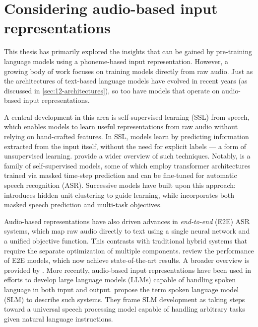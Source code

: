 
\section{Considering audio-based input representations}
\label{sec:17-audiomodels}

This thesis has primarily explored the insights that can be gained by pre-training language models using a phoneme-based input representation. However, a growing body of work focuses on training models directly from raw audio. Just as the architectures of text-based language models have evolved in recent years (as discussed in \cref{sec:12-architectures}), so too have models that operate on audio-based input representations.

A central development in this area is self-supervised learning (SSL) from speech, which enables models to learn useful representations from raw audio without relying on hand-crafted features. In SSL, models learn by predicting information extracted from the input itself, without the need for explicit labels --- a form of unsupervised learning. \citet{mohamed2022self} provide a wider overview of such techniques. Notably,   \citep{baevski2020wav2vec} is a family of self-supervised models, some of which employ transformer architectures trained via masked time-step prediction and can be fine-tuned for automatic speech recognition (ASR). Successive models have built upon this approach:  \citep{hsu-2021-hubert} introduces hidden unit clustering to guide learning, while  \citep{chen2022wavlm} incorporates both masked speech prediction and multi-task objectives.

Audio-based representations have also driven advances in \emph{end-to-end} (E2E) ASR systems, which map raw audio directly to text using a single neural network and a unified objective function. This contrasts with traditional hybrid systems that require the separate optimization of multiple components. \citet{li2022recent} review the performance of E2E models, which now achieve state-of-the-art results. A broader overview is provided by \citet{prabhavalkar2023end}. More recently, audio-based input representations have been used in efforts to develop large language models (LLMs) capable of handling spoken language in both input and output. \citet{arora2025landscapespokenlanguagemodels} propose the term spoken language model (SLM) to describe such systems. They frame SLM development as taking steps toward a universal speech processing model capable of handling arbitrary tasks given natural language instructions.

